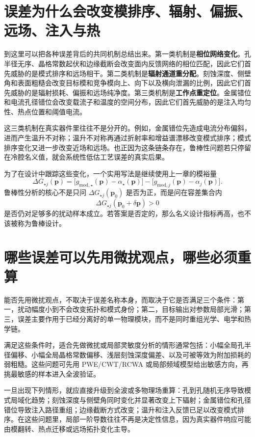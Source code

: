 \section{误差为什么会改变模排序、辐射、偏振、远场、注入与热}
到这里可以把各种误差背后的共同机制总结出来。第一类机制是\textbf{相位网络变化}。孔半径无序、晶格常数起伏和边缘截断会改变面内反馈网络的相位匹配，因此它们首先威胁的是模式排序和远场相干。第二类机制是\textbf{辐射通道重分配}。刻蚀深度、侧壁角和表面粗糙会改变目标模和竞争模向上、向下以及横向泄漏的比例，因此它们首先威胁的是辐射损耗、偏振和远场纯净度。第三类机制是\textbf{工作点重定位}。金属错位和电流孔径错位会改变载流子和温度的空间分布，因此它们首先威胁的是注入均匀性、热点位置和阈值电流。

这三类机制在真实器件里往往不是分开的。例如，金属错位先造成电流分布偏斜，进而产生温升不对称；温升不对称再通过折射率和增益谱漂移改变模式排序；模式排序变化又进一步改变近场和远场。也正因为这条链条存在，鲁棒性问题若只停留在冷腔名义值，就会系统性低估工艺误差的真实后果。

为了在设计中跟踪这些变化，一个实用写法是继续使用上一章的模裕量
\begin{equation}
\Delta G_{\star j}(\bm{p})
=
\bigl[g_{\mathrm{mod},\star}(\bm{p})-\alpha_{\star}(\bm{p})\bigr]
-
\bigl[g_{\mathrm{mod},j}(\bm{p})-\alpha_{j}(\bm{p})\bigr].
\label{eq:robust-margin}
\end{equation}
鲁棒性分析的核心不是只问 $\Delta G_{\star j}(\bm{p}_0)$ 是否为正，而是问在容差集合内
\begin{equation}
\Delta G_{\star j}(\bm{p}_0+\delta\bm{p}) > 0
\end{equation}
是否仍对足够多的扰动样本成立。若答案是否定的，那么名义设计指标再高，也不该被称为鲁棒设计。

\section{哪些误差可以先用微扰观点，哪些必须重算}
能否先用微扰观点，不取决于误差名称本身，而取决于它是否满足三个条件：第一，扰动幅度小到不会改变拓扑和模式身份；第二，目标输出对参数局部光滑；第三，误差主要作用于已经分离好的单一物理模块，而不是同时重组光学、电学和热学链。

满足这些条件时，适合先做微扰或局部灵敏度分析的情形通常包括：小幅全局孔半径偏移、小幅全局晶格常数偏移、浅层刻蚀深度偏差、以及可被等效为附加损耗的弱粗糙。这些问题可先用 PWE/CWT/RCWA 或局部频域模型给出敏感方向，再挑最敏感的样本进入全波验证。

一旦出现下列情形，就应直接升级到全波或多物理场重算：孔到孔随机无序导致模式局域化趋势；刻蚀深度与侧壁角同时变化并显著改变上下辐射；金属错位和孔径错位导致注入路径重组；边缘截断方式改变；温升和注入反馈已足以改变模式排序。在这些问题里，局部一阶导数往往不再是决定性信息，因为真实器件响应可能由模翻转、热点迁移或远场拓扑变化主导。

